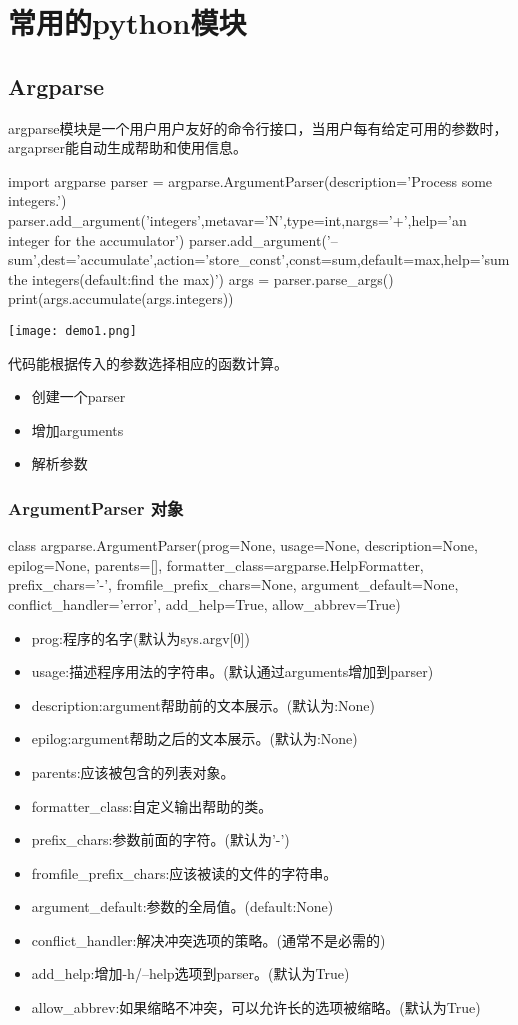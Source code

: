 \chapter{常用的python模块}
\section{Argparse}
argparse模块是一个用户用户友好的命令行接口，当用户每有给定可用的参数时，argaprser能自动生成帮助和使用信息。
\begin{python}
import argparse
parser = argparse.ArgumentParser(description='Process some integers.')
parser.add_argument('integers',metavar='N',type=int,nargs='+',help='an integer for the accumulator')
parser.add_argument('--sum',dest='accumulate',action='store_const',const=sum,default=max,help='sum the integers(default:find the max)')
args = parser.parse_args()
print(args.accumulate(args.integers))
\end{python}
\texttt{[image: demo1.png]}\newline

代码能根据传入的参数选择相应的函数计算。
\begin{itemize}
\item 创建一个parser
\item 增加arguments
\item 解析参数
\end{itemize}

\subsection{ArgumentParser 对象}
class argparse.ArgumentParser(prog=None, usage=None, description=None, epilog=None, parents=[], formatter\_class=argparse.HelpFormatter, prefix\_chars='-', fromfile\_prefix\_chars=None, argument\_default=None, conflict\_handler='error', add\_help=True, allow\_abbrev=True)
\begin{itemize}
\item prog:程序的名字(默认为sys.argv[0])
\item usage:描述程序用法的字符串。(默认通过arguments增加到parser)
\item description:argument帮助前的文本展示。(默认为:None)
\item epilog:argument帮助之后的文本展示。(默认为:None)
\item parents:应该被包含的列表对象。
\item formatter\_class:自定义输出帮助的类。
\item prefix\_chars:参数前面的字符。(默认为'-')
\item fromfile\_prefix\_chars:应该被读的文件的字符串。
\item argument\_default:参数的全局值。(default:None)
\item conflict\_handler:解决冲突选项的策略。(通常不是必需的)
\item add\_help:增加-h/--help选项到parser。(默认为True)
\item allow\_abbrev:如果缩略不冲突，可以允许长的选项被缩略。(默认为True)
\end{itemize}
